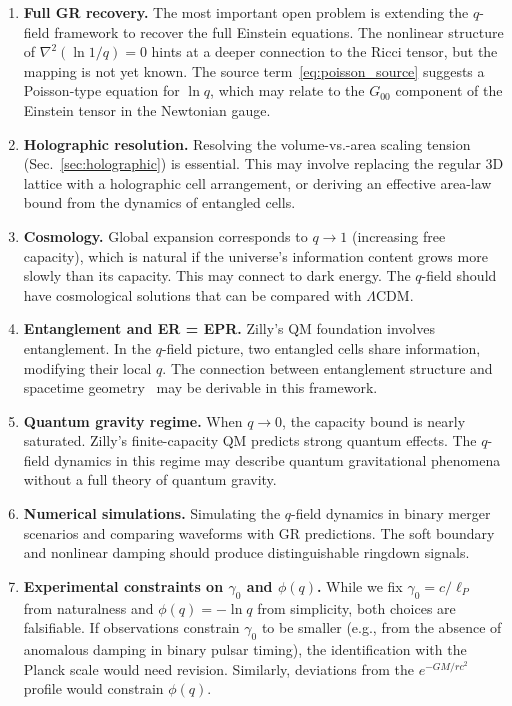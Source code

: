 \documentclass[aps,prd,twocolumn,showpacs,superscriptaddress,preprintnumbers]{revtex4-2}
\begin{document}
\begin{enumerate}
    \item \textbf{Full GR recovery.} The most important open problem is extending the $q$-field framework to recover the full Einstein equations. The nonlinear structure of $\nabla^2(\ln 1/q)=0$ hints at a deeper connection to the Ricci tensor, but the mapping is not yet known. The source term~\eqref{eq:poisson_source} suggests a Poisson-type equation for $\ln q$, which may relate to the $G_{00}$ component of the Einstein tensor in the Newtonian gauge.

    \item \textbf{Holographic resolution.} Resolving the volume-vs.-area scaling tension (Sec.~\ref{sec:holographic}) is essential. This may involve replacing the regular 3D lattice with a holographic cell arrangement, or deriving an effective area-law bound from the dynamics of entangled cells.

    \item \textbf{Cosmology.} Global expansion corresponds to $q\to1$ (increasing free capacity), which is natural if the universe's information content grows more slowly than its capacity. This may connect to dark energy. The $q$-field should have cosmological solutions that can be compared with $\Lambda$CDM.

    \item \textbf{Entanglement and ER = EPR.} Zilly's QM foundation involves entanglement. In the $q$-field picture, two entangled cells share information, modifying their local $q$. The connection between entanglement structure and spacetime geometry~\cite{Maldacena:2013je} may be derivable in this framework.

    \item \textbf{Quantum gravity regime.} When $q\to0$, the capacity bound is nearly saturated. Zilly's finite-capacity QM predicts strong quantum effects. The $q$-field dynamics in this regime may describe quantum gravitational phenomena without a full theory of quantum gravity.

    \item \textbf{Numerical simulations.} Simulating the $q$-field dynamics in binary merger scenarios and comparing waveforms with GR predictions. The soft boundary and nonlinear damping should produce distinguishable ringdown signals.

    \item \textbf{Experimental constraints on $\gamma_0$ and $\phi(q)$.} While we fix $\gamma_0=c/\ell_P$ from naturalness and $\phi(q)=-\ln q$ from simplicity, both choices are falsifiable. If observations constrain $\gamma_0$ to be smaller (e.g., from the absence of anomalous damping in binary pulsar timing), the identification with the Planck scale would need revision. Similarly, deviations from the $e^{-GM/rc^2}$ profile would constrain $\phi(q)$.


\end{enumerate}
\end{document}
